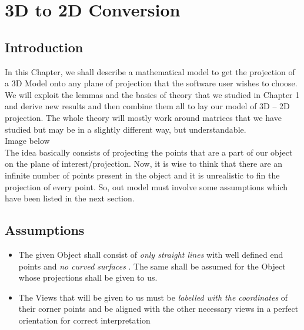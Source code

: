 \documentclass[12pt]{report}
\begin{document}
\chapter{3D to 2D Conversion}

\section{Introduction}

In this Chapter, we shall describe a mathematical model to get the projection of a 3D Model onto any plane of projection that the software user wishes to choose. We will exploit the lemmas and the basics of theory that we studied in Chapter 1 and derive new results and then combine them all to lay our model of 3D – 2D projection. The whole theory will mostly work around matrices that we have studied but may be in a slightly different way, but understandable. \\

Image below \vspace{4cm}
\\

\hspace{1cm} The idea basically consists of projecting the points that are a part of our object on the plane of interest/projection. Now, it is wise to think that there are an infinite number of points present in the object and it is unrealistic to fin the projection of every point. So, out model must involve some assumptions which have been listed in the next section.\\





\section{Assumptions}

\begin{itemize}%
    \item 
  The given Object shall consist of \textit{ only straight lines } with well defined end points and \textit{ no curved surfaces } . The same shall be assumed for the Object whose projections shall be given to us.
    \item 
  The Views that will be given to us must be \textit{ labelled with the coordinates } of their corner points and be aligned with the other necessary views in a perfect orientation for correct interpretation
\end{itemize}
\end{document}
